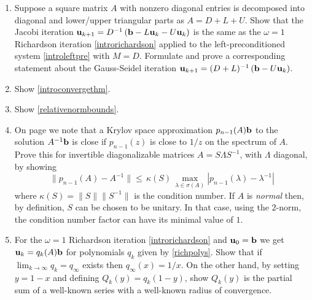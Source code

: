 \renewcommand{\labelenumi}{\arabic{chapter}.\arabic{enumi}\quad}
\begin{enumerate}
\item \label{exer:ls:jacobirichardson}  Suppose a square matrix $A$ with nonzero diagonal entries is decomposed into diagonal and lower/upper triangular parts as $A=D+L+U$.  Show that the Jacobi iteration $\mathbf{u}_{k+1} = D^{-1} \left(\mathbf{b} - L \mathbf{u}_k - U \mathbf{u}_k\right)$ is the same as the $\omega=1$ Richardson iteration \eqref{introrichardson} applied to the left-preconditioned system \eqref{introleftpre} with $M=D$.  Formulate and prove a corresponding statement about the Gauss-Seidel iteration $\mathbf{u}_{k+1} = (D+L)^{-1} \left(\mathbf{b} - U \mathbf{u}_k\right)$.

\item \label{exer:ls:showconvergethm}  Show \eqref{introconvergethm}.

\item \label{exer:ls:errornorms}  Show \eqref{relativenormbounds}.

\item On page \pageref{eq:ls:krylovgoal} we note that a Krylov space approximation $p_{n-1}(A)\mathbf{b}$ to the solution $A^{-1}\mathbf{b}$ is close if $p_{n-1}(z)$ is close to $1/z$ on the spectrum of $A$.  Prove this for invertible diagonalizable matrices $A=S\Lambda S^{-1}$, with $\Lambda$ diagonal, by showing
	$$\|p_{n-1}(A) - A^{-1}\| \le \,\kappa(S)\, \max_{\lambda \in \sigma(A)} |p_{n-1}(\lambda) - \lambda^{-1}|$$
where $\kappa(S) = \|S\| \|S^{-1}\|$ is the condition number.  If $A$ is \emph{normal} then, by definition, $S$ can be chosen to be unitary.  In that case, using the $2$-norm, the condition number factor can have its minimal value of $1$.

\item For the $\omega=1$ Richardson iteration \eqref{introrichardson} and $\mathbf{u}_0=\mathbf{b}$ we get $\mathbf{u}_k = q_k(A) \mathbf{b}$ for polynomials $q_k$ given by \eqref{richpolys}.  Show that if $\lim_{k\to\infty} q_k=q_\infty$ exists then $q_\infty(x)=1/x$.  On the other hand, by setting $y=1-x$ and defining $Q_k(y)=q_k(1-y)$, show $Q_k(y)$ is the partial sum of a well-known series with a well-known radius of convergence.


\end{enumerate}
